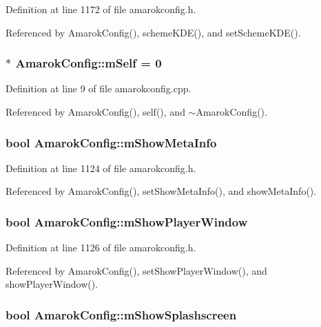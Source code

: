 Definition at line 1172 of file amarokconfig.h.

Referenced by Amarok\-Config(), scheme\-KDE(), and set\-Scheme\-KDE().
\subsubsection{ $\ast$ {\bf Amarok\-Config::m\-Self} = 0\hspace{0.3cm}{\tt  [static, protected]}}\label{classAmarokConfig_AmarokConfigt0}




Definition at line 9 of file amarokconfig.cpp.

Referenced by Amarok\-Config(), self(), and $\sim$Amarok\-Config().
\subsubsection{\setlength{\rightskip}{0pt plus 5cm}bool {\bf Amarok\-Config::m\-Show\-Meta\-Info}\hspace{0.3cm}{\tt  [protected]}}\label{classAmarokConfig_AmarokConfigp10}




Definition at line 1124 of file amarokconfig.h.

Referenced by Amarok\-Config(), set\-Show\-Meta\-Info(), and show\-Meta\-Info().
\subsubsection{\setlength{\rightskip}{0pt plus 5cm}bool {\bf Amarok\-Config::m\-Show\-Player\-Window}\hspace{0.3cm}{\tt  [protected]}}\label{classAmarokConfig_AmarokConfigp12}




Definition at line 1126 of file amarokconfig.h.

Referenced by Amarok\-Config(), set\-Show\-Player\-Window(), and show\-Player\-Window().
\subsubsection{\setlength{\rightskip}{0pt plus 5cm}bool {\bf Amarok\-Config::m\-Show\-Splashscreen}\hspace{0.3cm}{\tt  [protected]}}\label{classAmarokConfig_AmarokConfigp24}




